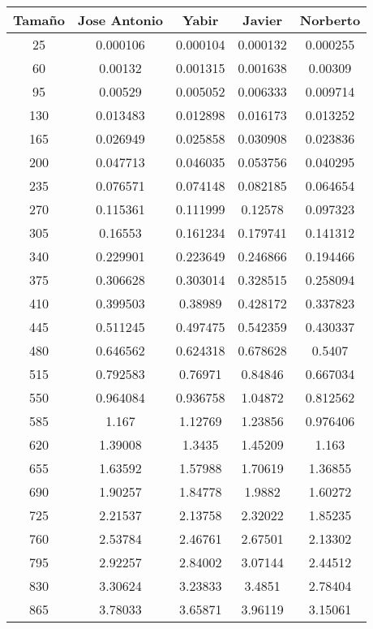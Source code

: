 \documentclass{article}
\begin{document}
 \newpage
{}

\begin{tabular}{ | c | c  | c | c | c | }
  \hline
   Tama\~no & Jose Antonio & Yabir & Javier & Norberto\\ 
   \hline
25	&	0.000106	&	0.000104	&	0.000132	&	0.000255	\\
60	&	0.00132	&	0.001315	&	0.001638	&	0.00309	\\
95	&	0.00529	&	0.005052	&	0.006333	&	0.009714	\\
130	&	0.013483	&	0.012898	&	0.016173	&	0.013252	\\
165	&	0.026949	&	0.025858	&	0.030908	&	0.023836	\\
200	&	0.047713	&	0.046035	&	0.053756	&	0.040295	\\
235	&	0.076571	&	0.074148	&	0.082185	&	0.064654	\\
270	&	0.115361	&	0.111999	&	0.12578	&	0.097323	\\
305	&	0.16553	&	0.161234	&	0.179741	&	0.141312	\\
340	&	0.229901	&	0.223649	&	0.246866	&	0.194466	\\
375	&	0.306628	&	0.303014	&	0.328515	&	0.258094	\\
410	&	0.399503	&	0.38989	&	0.428172	&	0.337823	\\
445	&	0.511245	&	0.497475	&	0.542359	&	0.430337	\\
480	&	0.646562	&	0.624318	&	0.678628	&	0.5407	\\
515	&	0.792583	&	0.76971	&	0.84846	&	0.667034	\\
550	&	0.964084	&	0.936758	&	1.04872	&	0.812562	\\
585	&	1.167	&	1.12769	&	1.23856	&	0.976406	\\
620	&	1.39008	&	1.3435	&	1.45209	&	1.163	\\
655	&	1.63592	&	1.57988	&	1.70619	&	1.36855	\\
690	&	1.90257	&	1.84778	&	1.9882	&	1.60272	\\
725	&	2.21537	&	2.13758	&	2.32022	&	1.85235	\\
760	&	2.53784	&	2.46761	&	2.67501	&	2.13302	\\
795	&	2.92257	&	2.84002	&	3.07144	&	2.44512	\\
830	&	3.30624	&	3.23833	&	3.4851	&	2.78404	\\
865	&	3.78033	&	3.65871	&	3.96119	&	3.15061	\\

  \hline
 \end{tabular}
 
\end{document}
